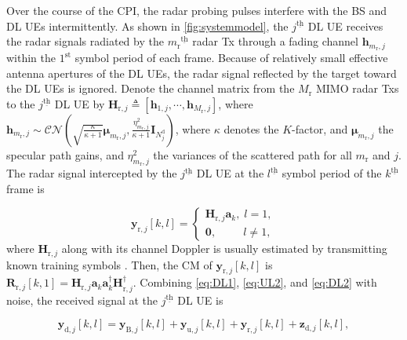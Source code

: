 \documentclass[10pt,journal]{IEEEtran}
\newcommand{\paren}[1]{\left({#1}\right)}
\newcommand{\bracket}[1]{{\left [{#1}\right ]}}
\newcommand{\ith}[1]    {{#1}^{\underline{\text{th}}}}
\newcommand{\rr}{_\mathrm{r}}
\theoremstyle{definition}
\begin{document}
Over the course of the CPI, the radar probing pulses interfere with the BS and DL UEs intermittently. As shown in \figurename{\;\ref{fig:systemmodel}}, the $\ith{j}$ DL UE receives the radar signals radiated by the $\ith{m\rr}$ radar Tx through a fading channel $\mathbf{h}_{m\rr, j}$ within the $1^{\mathrm{st}}$ symbol period of each frame. %
Because of relatively small effective antenna apertures of the DL UEs, the radar signal reflected by the target toward the DL UEs is ignored. Denote the channel matrix from the $\mathit{M}\rr$ MIMO radar Txs to the $\ith{j}$ DL UE by $\mathbf{H}_{\mathrm{r},j}\triangleq\bracket{\mathbf{h}_{\mathrm{1},j},\cdots,\mathbf{h}_{\mathit{M}\rr,j}}$, where $\mathbf{h}_{m\rr, j}\sim\mathcal{CN}\paren{\sqrt{\frac{\kappa}{\kappa+1}}\boldsymbol{\mu}_{m\rr,j},\frac{\eta^2_{m\rr,j}}{\kappa+1}\mathbf{I}_{\mathit{N}^{\textrm{d}}_j}}$, where $\kappa$ denotes the $K$-factor, and $\boldsymbol{\mu}_{m\rr,j}$ the specular path gains, and $\eta^2_{m\rr,j}$ the variances of the scattered path for all $m\rr$ and $j$. The radar signal intercepted by the $\ith{j}$ DL UE at the $\ith{l}$ symbol period of the $\ith{k}$ frame is \par\noindent\small
\begin{equation}
    \mathbf{y}_{\mathrm{r},j}\bracket{k,l}=
    \begin{cases}
    \mathbf{H}_{\mathrm{r},j}\mathbf{a}_k, \;l=1,\\
    \mathbf{0}, \qquad~~ l\neq1,
    \end{cases}\label{eq:DL2}
\end{equation}
\normalsize
where $\mathbf{H}_{\mathrm{r},j}$ along with its channel Doppler is usually estimated by transmitting known training symbols
\cite{MCMIMO_RadComm}. Then, the CM of $\mathbf{y}_{\mathrm{r},j}\bracket{k,l}$ is $\mathbf{R}_{\mathrm{r},j}\bracket{k,1}=\mathbf{H}_{\mathrm{r},j}\mathbf{a}_k\mathbf{a}^\dagger_k\mathbf{H}^\dagger_{\mathrm{r},j}$. Combining \eqref{eq:DL1}, \eqref{eq:UL2}, and \eqref{eq:DL2} with noise, the received signal at the $\ith{j}$ DL UE is\par\noindent\small
\begin{equation}
\mathbf{y}_{\textrm{d},j}\bracket{k,l}=\mathbf{y}_{\textrm{B},j}\bracket{k,l}+\mathbf{y}_{\mathrm{u},j}\bracket{k,l}+\mathbf{y}_{\mathrm{r},j}\bracket{k,l}+\mathbf{z}_{\textrm{d},j}\bracket{k,l},
\end{equation}\normalsize
\end{document}
